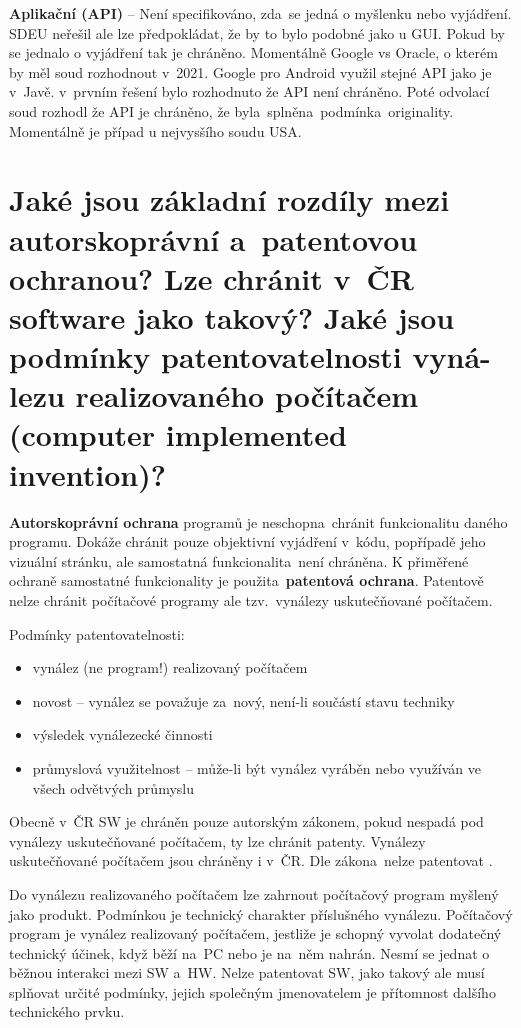 \textbf{Aplikační (API)} -- Není specifikováno, zda~se jedná o myšlenku nebo vyjádření. SDEU neřešil ale lze předpokládat, že by to bylo podobné jako u GUI\@. Pokud by se jednalo o vyjádření tak je chráněno. Momentálně Google vs Oracle, o kterém by měl soud rozhodnout v~2021. Google pro Android využil stejné API jako je v~Javě. v~prvním řešení bylo rozhodnuto že API není chráněno. Poté odvolací soud rozhodl že API je chráněno, že byla~splněna~podmínka~originality. Momentálně je případ u nejvysšího soudu USA\@.


\section{Jaké jsou základní rozdíly mezi autorskoprávní a~patentovou ochranou? Lze chránit v~ČR software jako takový? Jaké jsou podmínky patentovatelnosti vyná-lezu realizovaného počítačem (computer implemented invention)?}

\textbf{Autorskoprávní ochrana} programů je neschopna~chránit funkcionalitu daného programu. Dokáže chránit pouze objektivní vyjádření v~kódu, popřípadě jeho vizuální stránku, ale samostatná funkcionalita~není chráněna. K přiměřené ochraně samostatné funkcionality je použita~\textbf{patentová ochrana}. Patentově nelze chránit počítačové programy ale tzv.\ vynálezy uskutečňované počítačem.
\newline

\noindent Podmínky patentovatelnosti:
\begin{itemize}[noitemsep]
    \item vynález (ne program!) realizovaný počítačem
    \item novost -- vynález se považuje za~nový, není-li součástí stavu techniky
    \item výsledek vynálezecké činnosti
    \item průmyslová využitelnost -- může-li být vynález vyráběn nebo využíván ve všech odvětvých průmyslu
\end{itemize}
Obecně v~ČR SW je chráněn pouze autorským zákonem, pokud nespadá pod vynálezy uskutečňované počítačem, ty lze chránit patenty.
Vynálezy uskutečňované počítačem jsou chráněny i v~ČR. Dle zákona~nelze patentovat .

Do vynálezu realizovaného počítačem lze zahrnout počítačový program myšlený jako produkt. Podmínkou je technický charakter příslušného vynálezu. Počítačový program je vynález realizovaný počítačem, jestliže je schopný vyvolat dodatečný technický účinek, když běží na~PC nebo je na~něm nahrán. Nesmí se jednat o běžnou interakci mezi SW a~HW\@. Nelze patentovat SW, jako takový ale musí splňovat určité podmínky, jejich společným jmenovatelem je přítomnost dalšího technického prvku.


